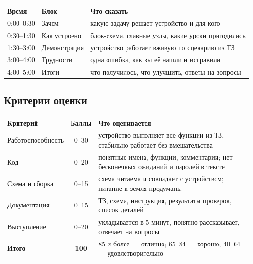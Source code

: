 \begin{center}\small
\begin{tabularx}{\textwidth}{@{}l l X@{}}
\toprule
Время & Блок & Что сказать \\
\midrule
0:00--0:30 & Зачем & какую задачу решает устройство и для кого \\
0:30--1:30 & Как устроено & блок-схема, главные узлы, какие уроки пригодились \\
1:30--3:00 & Демонстрация & устройство работает вживую по сценарию из ТЗ \\
3:00--4:00 & Трудности & одна ошибка, как вы её нашли и исправили \\
4:00--5:00 & Итоги & что получилось, что улучшить, ответы на вопросы \\
\bottomrule
\end{tabularx}
\end{center}

\subsection{Критерии оценки}

\begin{center}\small
\begin{tabularx}{\textwidth}{@{}l c X@{}}
\toprule
Критерий & Баллы & Что оценивается \\
\midrule
Работоспособность & 0--30 & устройство выполняет все функции из ТЗ, стабильно работает без вмешательства \\
Код & 0--20 & понятные имена, функции, комментарии; нет бесконечных ожиданий и паролей в тексте \\
Схема и сборка & 0--15 & схема читаема и совпадает с устройством; питание и земля продуманы \\
Документация & 0--15 & ТЗ, схема, инструкция, результаты проверок, список деталей \\
Выступление & 0--20 & укладывается в 5 минут, понятно рассказывает, отвечает на вопросы \\
\midrule
\textbf{Итого} & \textbf{100} & 85 и более --- отлично; 65--84 --- хорошо; 40--64 --- удовлетворительно \\
\bottomrule
\end{tabularx}
\end{center}

